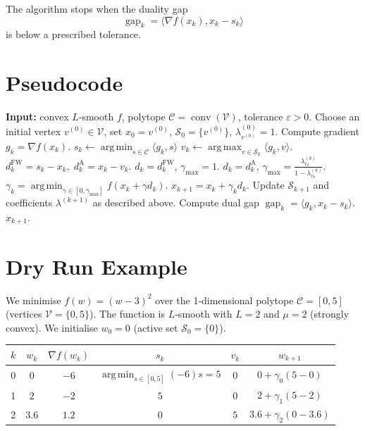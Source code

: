 \documentclass{article}
\newcommand{\C}{\mathcal{C}}
\newcommand{\gap}{\operatorname{gap}}
\newcommand{\conv}{\operatorname{conv}}
\newcommand{\argmin}{\operatorname*{arg\,min}}
\newcommand{\argmax}{\operatorname*{arg\,max}}
\begin{document}
The algorithm stops when the duality gap
\[
\gap_{k}= \langle \nabla f(x_{k}), x_{k}-s_{k}\rangle
\]
is below a prescribed tolerance.

\section*{Pseudocode}
\begin{algorithm}[H]
\caption{Away–Step Frank–Wolfe (AFW)}
\begin{algorithmic}[1]
\STATE \textbf{Input:} convex $L$‑smooth $f$, polytope $\C=\conv(\mathcal{V})$, tolerance $\varepsilon>0$.
\STATE Choose an initial vertex $v^{(0)}\in\mathcal{V}$, set $x_{0}=v^{(0)}$, $\mathcal{S}_{0}=\{v^{(0)}\}$, $\lambda^{(0)}_{v^{(0)}}=1$.
    \STATE Compute gradient $g_{k}= \nabla f(x_{k})$.
    \STATE $s_{k}\gets \argmin_{s\in\C}\langle g_{k},s\rangle$ \hfill{}
    \STATE $v_{k}\gets \argmax_{v\in\mathcal{S}_{k}}\langle g_{k},v\rangle$.
    \STATE $d^{\text{FW}}_{k}=s_{k}-x_{k},\; d^{\text{A}}_{k}=x_{k}-v_{k}$.
        \STATE $d_{k}=d^{\text{FW}}_{k}$, $\gamma_{\max}=1$.
    \ELSE
        \STATE $d_{k}=d^{\text{A}}_{k}$, $\displaystyle\gamma_{\max}= \frac{\lambda^{(k)}_{v_{k}}}{1-\lambda^{(k)}_{v_{k}}}$.
    \ENDIF
    \STATE $\displaystyle\gamma_{k}= \argmin_{\gamma\in[0,\gamma_{\max}]} f(x_{k}+ \gamma d_{k})$.
    \STATE $x_{k+1}= x_{k}+ \gamma_{k} d_{k}$.
    \STATE Update $\mathcal{S}_{k+1}$ and coefficients $\lambda^{(k+1)}$ as described above.
    \STATE Compute dual gap $\gap_{k}= \langle g_{k},x_{k}-s_{k}\rangle$.
    \IF{$\gap_{k}\le\varepsilon$}
        \RETURN $x_{k+1}$.
    \ENDIF
\ENDFOR
\end{algorithmic}
\end{algorithm}

\section*{Dry Run Example}
We minimise $f(w)=(w-3)^{2}$ over the 1‑dimensional polytope $\C=[0,5]$ (vertices $\mathcal{V}=\{0,5\}$).  
The function is $L$‑smooth with $L=2$ and $\mu=2$ (strongly convex).  
We initialise $w_{0}=0$ (active set $\mathcal{S}_{0}=\{0\}$).

\begin{center}
\begin{tabular}{c|c|c|c|c|c}
$k$ & $w_{k}$ & $\nabla f(w_{k})$ & $s_{k}$ & $v_{k}$ & $w_{k+1}$ \\
\hline
0 & $0$ & $-6$ & $\displaystyle\argmin_{s\in[0,5]}(-6)s =5$ & $0$ & $0+ \gamma_{0}(5-0)$ \\
1 & $2$ & $-2$ & $5$ & $0$ & $2+ \gamma_{1}(5-2)$ \\
2 & $3.6$ & $1.2$ & $0$ & $5$ & $3.6+ \gamma_{2}(0-3.6)$
\end{tabular}
\end{center}
\end{document}
